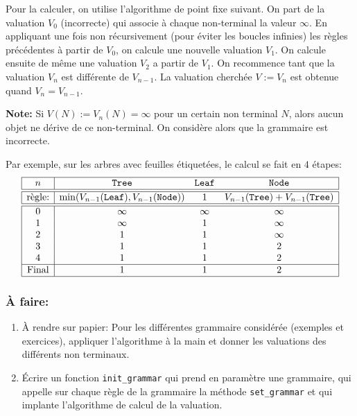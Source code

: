 \documentclass[11pt]{article}
\newcounter{asuivre}
\newenvironment{asks}{\begin{enumerate}\setcounter{enumi}{\theasuivre}}%
                       {\setcounter{asuivre}{\theenumi}\end{enumerate}}
\begin{document}
Pour la calculer, on utilise l'algorithme de point fixe suivant. On part de la
valuation $V_0$ (incorrecte) qui associe à chaque non-terminal la valeur
$\infty$. En appliquant une fois non récursivement (pour éviter les boucles
infinies) les règles précédentes à partir de $V_0$, on calcule une nouvelle
valuation $V_1$.  On calcule ensuite de même une valuation $V_2$ a partir de
$V_1$. On recommence tant que la valuation $V_n$ est différente de
$V_{n-1}$. La valuation cherchée $V := V_n$ est obtenue quand $V_n=V_{n-1}$.
\bigskip

\noindent\textbf{Note:} Si $V(N) := V_n(N) = \infty$ pour un certain non terminal
$N$, alors aucun objet ne dérive de ce non-terminal. On considère alors que la
grammaire est incorrecte.  \bigskip

Par exemple, sur les arbres avec feuilles étiquetées, le calcul se fait en $4$ étapes:
$$\begin{array}{|c|ccc|}
\hline
  n     &  \texttt{Tree}  &  \texttt{Leaf}  &  \texttt{Node} \\
\hline\hline
  \text{règle:} & \min(V_{n-1}(\texttt{Leaf}),V_{n-1}(\texttt{Node}))
               & 1
               & V_{n-1}(\texttt{Tree}) + V_{n-1}(\texttt{Tree}) \\
\hline\hline
  0     &  \infty         &  \infty         &  \infty        \\
  1     &  \infty         &  1              &  \infty        \\
  2     &  1              &  1              &  \infty        \\
  3     &  1              &  1              &  2             \\
  4     &  1              &  1              &  2             \\
\hline
 \text{Final} &  1              &  1              &  2             \\
\hline
\end{array}$$

\subsubsection{À faire:}

\begin{asks}
\item À rendre sur papier: Pour les différentes grammaire considérée (exemples et exercices), appliquer
  l'algorithme à la main et donner les valuations des différents non
  terminaux.
\item Écrire un fonction \texttt{init\_grammar} qui prend en paramètre une
  grammaire, qui appelle sur chaque règle de la grammaire la méthode
  \verb+set_grammar+ et qui implante l'algorithme de calcul de la valuation. 
\end{asks}
\end{document}
